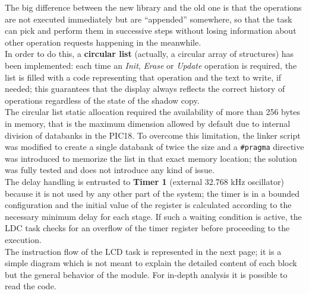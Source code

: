 The big difference between the new library and the old one is that the operations are not executed immediately but are ``appended'' somewhere, so that the task can pick and perform them in successive steps without losing information about other operation requests happening in the meanwhile.\\
In order to do this, a \textbf{circular list} (actually, a circular array of structures) has been implemented: each time an \textit{Init}, \textit{Erase} or \textit{Update} operation is required, the list is filled with a code representing that operation and the text to write, if needed; this guarantees that the display always reflects the correct history of operations regardless of the state of the shadow copy.\\
The circular list static allocation required the availability of more than 256 bytes in memory, that is the maximum dimension allowed by default due to internal division of databanks in the PIC18. To overcome this limitation, the linker script was modified to create a single databank of twice the size and a \texttt{\#pragma} directive was introduced to memorize the list in that exact memory location; the solution was fully tested and does not introduce any kind of issue.\\


The delay handling is entrusted to \textbf{Timer 1} (external 32.768 kHz oscillator) because it is not used by any other part of the system; the timer is in a bounded configuration and the initial value of the register is calculated according to the necessary minimum delay for each stage. If such a waiting condition is active, the LDC task checks for an overflow of the timer register before proceeding to the execution.\\

The instruction flow of the LCD task is represented in the next page; it is a simple diagram which is not meant to explain the detailed content of each block but the general behavior of the module. For in-depth analysis it is possible to read the code.

